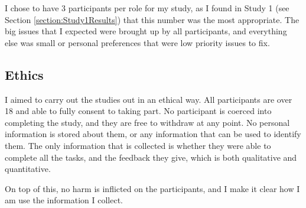 I chose to have 3 participants per role for my study, as I found in Study 1 (see Section \ref{section:Study1Results}) that this number was the most appropriate. The big issues that I expected were brought up by all participants, and everything else was small or personal preferences that were low priority issues to fix.

\subsection{Ethics}

I aimed to carry out the studies out in an ethical way. All participants are over 18 and able to fully consent to taking part. No participant is coerced into completing the study, and they are free to withdraw at any point. No personal information is stored about them, or any information that can be used to identify them. The only information that is collected is whether they were able to complete all the tasks, and the feedback they give, which is both qualitative and quantitative.

On top of this, no harm is inflicted on the participants, and I make it clear how I am use the information I collect. 

